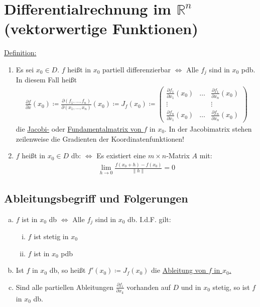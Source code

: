 \documentclass{article}
\begin{document}
\section{Differentialrechnung im $\mathbb{R}^n$ (vektorwertige Funktionen)}
\underline{Definition:}
\begin{enumerate}
    \item Es sei $x_0 \in D$. $f$ heißt in $x_0$ partiell differenzierbar $\Leftrightarrow$ Alle $f_j$ sind in $x_0$ pdb. In diesem Fall heißt
    \begin{align*}
        \frac{\partial f}{\partial x}(x_0) \coloneqq \frac{\partial (f_1, \ldots, f_n)}{\partial (x_1, \ldots, x_n)} (x_0) \coloneqq J_f(x_0) \coloneqq
        \begin{pmatrix} \frac{\partial f_1}{\partial x_1}(x_0) & \ldots & \frac{\partial f_1}{\partial x_n}(x_0) \\ \vdots & & \vdots \\ 
        \frac{\partial f_n}{\partial x_1}(x_0) & \ldots & \frac{\partial f_n}{\partial x_n}(x_0)\end{pmatrix}
    \end{align*}
    die \underline{Jacobi-} oder \underline{Fundamentalmatrix von $f$} in $x_0$. In der Jacobimatrix stehen zeilenweise die Gradienten der Koordinatenfunktionen!
    \item $f$ heißt in $x_0 \in D$ db: $\Leftrightarrow$ Es existiert eine $m \times n$-Matrix $A$ mit: 
    \begin{align*}
        \lim \limits_{h \to 0} \frac{f(x_0 + h) - f(x_0)}{\lVert h \rVert} = 0
    \end{align*}
\end{enumerate}

\subsection{Ableitungsbegriff und Folgerungen}
\begin{enumerate} [a)]
    \item $f$ ist in $x_0$ db $\Leftrightarrow$ Alle $f_j$ sind in $x_0$ db. I.d.F. gilt:
    \begin{enumerate} [i)]
        \item $f$ ist stetig in $x_0$
        \item $f$ ist in $x_0$ pdb
    \end{enumerate}
    \item Ist $f$ in $x_0$ db, so heißt $f'(x_0) \coloneqq J_f(x_0)$ die \underline{Ableitung von $f$ in $x_0$.}
    \item Sind alle partiellen Ableitungen $\frac{\partial f_i}{\partial x_k}$ vorhanden auf $D$ und in $x_0$ stetig, so ist $f$ in $x_0$ db.
\end{enumerate}
\end{document}
